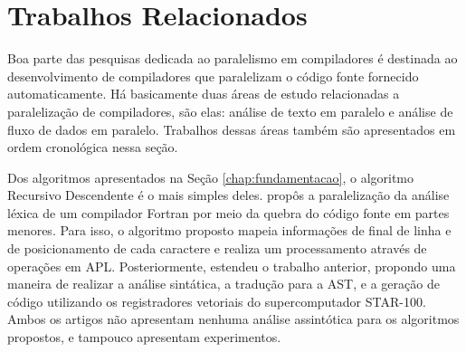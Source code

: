 
\newcommand{\sla}{\textbackslash}

\newcommand{\cmd}[1]{\textsf{#1}}

\newcommand{\pkg}[1]{\textsf{#1}}

\newcommand{\ltxcmd}[1]{\cmd{\sla{}#1}}

\chapter{Trabalhos Relacionados}
\label{chap:related_works}

Boa parte das pesquisas dedicada ao paralelismo
em compiladores é destinada ao desenvolvimento de compiladores que
paralelizam o código fonte fornecido automaticamente.
Há basicamente
duas áreas de estudo relacionadas a paralelização de compiladores, são
elas: análise de texto em paralelo e análise de fluxo de dados em paralelo.
Trabalhos dessas áreas também são apresentados em ordem cronológica nessa seção.

Dos algoritmos apresentados na Seção \ref{chap:fundamentacao}, o algoritmo
Recursivo Descendente é o mais simples deles. \cite{Lincoln:1970:PPT:987475.987478}
propôs a paralelização da análise léxica de um compilador
Fortran por meio da quebra do código fonte em partes menores. Para isso, o algoritmo proposto mapeia
informações de final de
linha e de posicionamento de cada caractere e realiza um processamento através de operações em APL.
Posteriormente, \cite{Krohn:1975:PAC:390015.808414} estendeu o trabalho
anterior, propondo uma maneira de realizar a análise sintática, a
tradução para a AST, e a geração
de código utilizando os registradores vetoriais do supercomputador
STAR-100. Ambos os artigos não apresentam nenhuma
análise assintótica para os algoritmos propostos, e tampouco apresentam
experimentos.

